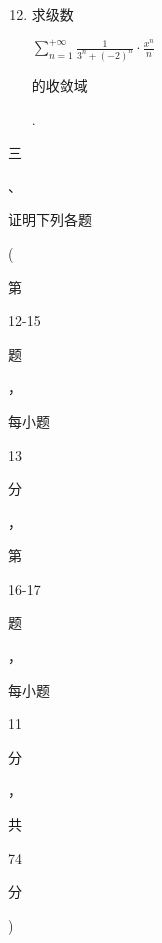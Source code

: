 \documentclass[10pt]{article}
\begin{document}
\begin{enumerate}
  \setcounter{enumi}{11}
  \item \begin{CJK}{UTF8}{mj}求级数\end{CJK} $\sum_{n=1}^{+\infty} \frac{1}{3^{n}+(-2)^{n}} \cdot \frac{x^{n}}{n}$ \begin{CJK}{UTF8}{mj}的收敛域\end{CJK}.
\end{enumerate}
\begin{CJK}{UTF8}{mj}三\end{CJK}、\begin{CJK}{UTF8}{mj}证明下列各题\end{CJK} (\begin{CJK}{UTF8}{mj}第\end{CJK} 12-15 \begin{CJK}{UTF8}{mj}题\end{CJK}，\begin{CJK}{UTF8}{mj}每小题\end{CJK} 13 \begin{CJK}{UTF8}{mj}分\end{CJK}，\begin{CJK}{UTF8}{mj}第\end{CJK} 16-17 \begin{CJK}{UTF8}{mj}题\end{CJK}，\begin{CJK}{UTF8}{mj}每小题\end{CJK} 11 \begin{CJK}{UTF8}{mj}分\end{CJK}，\begin{CJK}{UTF8}{mj}共\end{CJK} 74 \begin{CJK}{UTF8}{mj}分\end{CJK})
\end{document}

